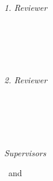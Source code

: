 \begin{titlepage}
	\vfill
	{\large \thesisSubject} \\[5mm]
	{\LARGE \color{ctcolortitle}\textbf{\thesisTitle} \\[10mm]}
	{\Large \thesisName} \\

	\vfill
	\begin{minipage}[t]{.27\textwidth}
		\raggedleft
		\textit{1. Reviewer}
	\end{minipage}
	\hspace*{15pt}
	\begin{minipage}[t]{.65\textwidth}
		{\Large \thesisFirstReviewer} \\
	  	{\small \thesisFirstReviewerDepartment} \\[-1mm]
		{\small \thesisFirstReviewerUniversity}
	\end{minipage} \\[5mm]
	\begin{minipage}[t]{.27\textwidth}
		\raggedleft
		\textit{2. Reviewer}
	\end{minipage}
	\hspace*{15pt}
	\begin{minipage}[t]{.65\textwidth}
		{\Large \thesisSecondReviewer} \\
	  	{\small \thesisSecondReviewerDepartment} \\[-1mm]
		{\small \thesisSecondReviewerUniversity}
	\end{minipage} \\[10mm]
	\begin{minipage}[t]{.27\textwidth}
		\raggedleft
		\textit{Supervisors}
	\end{minipage}
	\hspace*{15pt}
	\begin{minipage}[t]{.65\textwidth}
		\thesisFirstSupervisor\ and \thesisSecondSupervisor
	\end{minipage} \\[10mm]

	\thesisDate\\
	

\end{titlepage}
